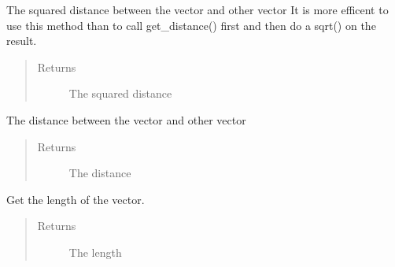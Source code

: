 \documentclass[letterpaper,10pt,english]{sphinxmanual}
\begin{document}
\begin{fulllineitems}
\begin{fulllineitems}
\begin{quote}
\begin{description}
\end{description}\end{quote}

\end{fulllineitems}


\begin{fulllineitems}
\label{geometry:serge.simplevecs.Vec2d.get_dist_sqrd}
The squared distance between the vector and other vector
It is more efficent to use this method than to call get\_distance()
first and then do a sqrt() on the result.
\begin{quote}\begin{description}
\item[{Returns}] \leavevmode
The squared distance

\end{description}\end{quote}

\end{fulllineitems}


\begin{fulllineitems}
\label{geometry:serge.simplevecs.Vec2d.get_distance}
The distance between the vector and other vector
\begin{quote}\begin{description}
\item[{Returns}] \leavevmode
The distance

\end{description}\end{quote}

\end{fulllineitems}


\begin{fulllineitems}
\label{geometry:serge.simplevecs.Vec2d.get_length}
Get the length of the vector.
\begin{quote}\begin{description}
\item[{Returns}] \leavevmode
The length

\end{description}\end{quote}


\end{fulllineitems}
\end{fulllineitems}
\end{document}
